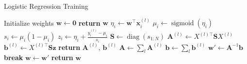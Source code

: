 \documentclass[10pt]{article}
\DeclareMathOperator*{\sigmoid}{sigmoid}
\DeclareMathOperator*{\diag}{diag}
\begin{document}

\begin{algorithm}

  \caption{Logistic Regression Training}

  \begin{algorithmic}[1] %
                  \State Initialize weights $\mathbf{w} \gets \mathbf{0}$
                  \State \textbf{return} $\mathbf{w}$
          \EndProcedure
          \Loop
                   
                          \State $\eta_i \gets \mathbf{w}^{\top} \mathbf{x}_i^{(l)}$ 
                          \State $\mu_i \gets \sigmoid(\eta_i)$
                          \State $s_i \gets \mu_i (1 - \mu_i)$
                          \State $z_i \gets \eta_i + \frac{y_i^{(l)} - \mu_i}{s_i}$
                          \State $\mathbf{S} \gets \diag(s_{1:N})$
                          \State $\mathbf{A}^{(l)} \gets X^{(l)\top} \mathbf{S} X^{(l)}$
                          \State $\mathbf{b}^{(l)} \gets X^{(l)\top} \mathbf{S} \mathbf{z}$
                          \State \textbf{return} $\mathbf{A}^{(l)}$, $\mathbf{b}^{(l)}$
                  \EndProcedure
                          \State $\mathbf{A} \gets \sum_l \mathbf{A}^{(l)}$
                          \State $\mathbf{b} \gets \sum_l \mathbf{b}^{(l)}$
                          \State $\mathbf{w'} \gets \mathbf{A}^{-1} \mathbf{b}$
                                  \State \textbf{break}
                          \EndIf
                          \State $\mathbf{w} \gets \mathbf{w'}$ 
                          \State \textbf{return} $\mathbf{w}$
                  \EndProcedure
          \EndLoop
  \end{algorithmic}

\end{algorithm}
\end{document}
